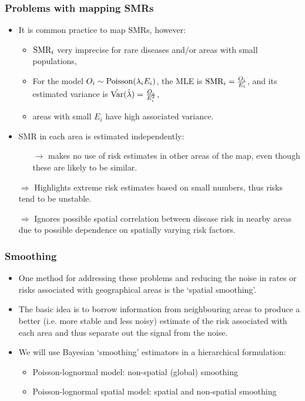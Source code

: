 \documentclass[12pt]{beamer}
\begin{document}

\begin{frame}
    \frametitle{Problems with mapping SMRs}
\begin{itemize} \setlength\itemsep{\fill}
\item It is common practice to map SMRs, however:
    \begin{itemize}
    \item  $\hbox{SMR}_i$ very imprecise for rare diseases and/or areas with small populations,
    \item  For the model $O_i \sim \hbox{Poisson}(\lambda_i E_i)$, the MLE is $\hbox{SMR}_i=\frac{O_i}{E_i}$, and its estimated variance is $\hat{\hbox{Var}}(\hat{\lambda}) =  \frac{O_i}{E_i^2}$,
    \item  areas with small $E_i$ have high associated variance.
    \end{itemize}
\vspace{0.2cm}
\item  SMR in each area is estimated independently:
    \begin{itemize}
    \item[$\rightarrow$] makes no use of risk estimates in other areas of the map, even though these are likely to be similar.
    \end{itemize}
\vspace{0.2cm}
\item[$\Rightarrow$] Highlights extreme risk estimates based on small numbers, thus risks tend to be unstable.
\vspace{0.2cm}
\item[$\Rightarrow$] Ignores possible spatial correlation between disease risk in nearby areas due to possible dependence on spatially varying risk factors.
\end{itemize}
\end{frame}

\begin{frame}
\frametitle{Smoothing}
\begin{itemize} \setlength\itemsep{\fill}
\item  One method for addressing these problems and reducing the noise in rates or risks associated with geographical areas is the \alert{`spatial smoothing'}.
\item \vfill The basic idea is to \alert{borrow information} from neighbouring areas to produce a better (i.e. more stable and less noisy) estimate of the risk associated with each area and thus separate out the signal from the noise.

\item  We will use Bayesian `smoothing' estimators in a hierarchical formulation:
\begin{itemize}
\item  \alert{Poisson-lognormal model: non-spatial (global) smoothing}
\item  \alert{Poisson-lognormal spatial model: spatial and non-spatial smoothing}
\end{itemize}
\end{itemize}
\end{frame}
\end{document}
